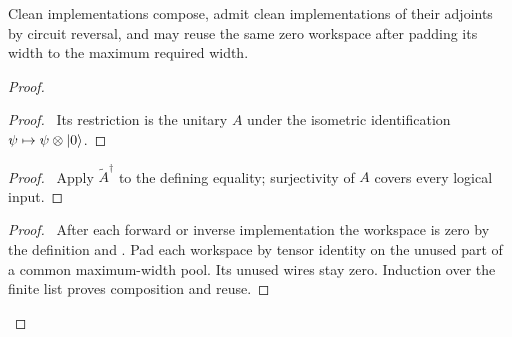 \begin{lemma}\label{lem:scratch}
Clean implementations compose, admit clean implementations of their
adjoints by circuit reversal, and may reuse the same zero workspace after
padding its width to the maximum required width.
\end{lemma}
\begin{proof}
 \begin{proof}\pf\ Its restriction is the unitary $A$ under the
 isometric identification $\psi\mapsto\psi\otimes\lvert 0\rangle$.\end{proof}
 \begin{proof}\pf\ Apply $\widetilde A^\dagger$ to the defining equality;
 surjectivity of $A$ covers every logical input.\end{proof}
 \qedstep
 \begin{proof}\pf\ After each forward or inverse implementation the
 workspace is zero by the definition and .
 Pad each workspace by tensor identity on the unused part of a common
 maximum-width pool. Its unused wires stay zero. Induction over the
 finite list proves composition and reuse.\end{proof}
\end{proof}

